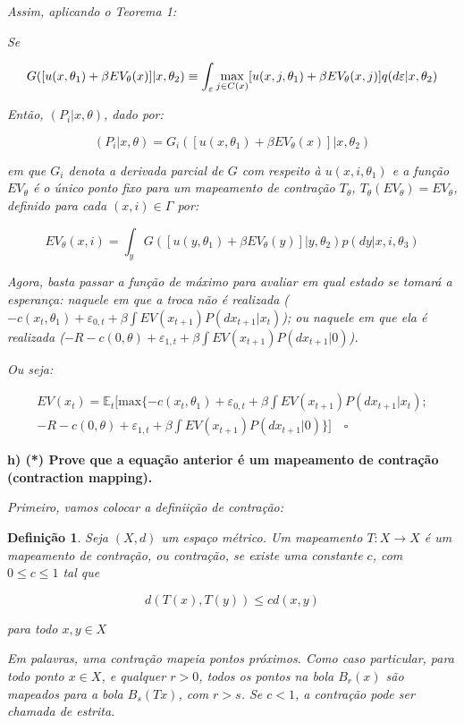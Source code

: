 \documentclass[12pt,a4paper]{article}
\newtheorem{definition}{Definição}
\begin{document}
\emph{Assim, aplicando o Teorema 1:}

\emph{Se}

\[G([u(x,\theta_1)+\beta EV_\theta(x)]|x,\theta_2) \\ \equiv \int_\varepsilon \max_{j \in C(x)} [u(x,j,\theta_1)+ \beta E V_\theta(x,j)]q(d\varepsilon|x,\theta_2)
\]

\emph{Então, \((P_i|x,\theta)\), dado por:}

\[
(P_i|x,\theta) = G_i([u(x,\theta_1)+ \beta EV_\theta(x)]|x,\theta_2)
\]

\emph{em que \(G_i\) denota a derivada parcial de \(G\) com respeito à
\(u(x,i,\theta_1)\) e a função \(EV_\theta\) é o único ponto fixo para
um mapeamento de contração \(T_\theta\),
\(T_\theta(EV_\theta)=EV_\theta\), definido para cada
\((x,i) \in \Gamma\) por:}

\[
EV_\theta(x,i)=\int_yG([u(y,\theta_1)+\beta EV_\theta (y)]|y,\theta_2)p(dy|x,i,\theta_3)
\]

\emph{Agora, basta passar a função de máximo para avaliar em qual estado
se tomará a esperança: naquele em que a troca não é realizada
(\(-c(x_t,\theta_1)+\varepsilon_{0,t} + \beta \int EV(x_{t+1})P(dx_{t+1}|x_t)\));
ou naquele em que ela é realizada
(\(-R -c(0,\theta) + \varepsilon_{1,t} + \beta \int EV(x_{t+1})P(dx_{t+1}|0)\)).}

\emph{Ou seja:}

\[
\begin{aligned}
EV(x_t)=\mathbb{E}_t[\text{max}\{-c(x_t,\theta_1)+\varepsilon_{0,t} + \beta \int EV(x_{t+1})P(dx_{t+1}|x_t); \\ -R -c(0,\theta) + \varepsilon_{1,t} + \beta \int EV(x_{t+1})P(dx_{t+1}|0)\}] \quad \square
\end{aligned}
\]

\textbf{h) (*) Prove que a equação anterior é um mapeamento de contração
(contraction mapping).}

\emph{Primeiro, vamos colocar a definiição de contração:}

\begin{definition}
Seja $(X,d)$ um espaço métrico. Um mapeamento $T:X \rightarrow X$ é um mapeamento de contração, ou contração, se existe uma constante $c$, com $0 \leq c \leq 1$ tal que  

\[
d(T(x),T(y)) \leq cd(x,y)
\]

para todo $x,y \in X$

\end{definition}

\emph{Em palavras, uma contração mapeia pontos próximos. Como caso
particular, para todo ponto \(x \in X\), e qualquer \(r>0\), todos os
pontos na bola \(B_r(x)\) são mapeados para a bola \(B_s(Tx)\), com
\(r > s\). Se \(c < 1\), a contração pode ser chamada de estrita.}
\end{document}
